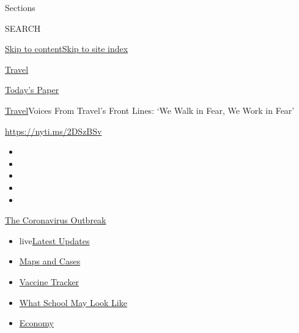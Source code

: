Sections

SEARCH

\protect\hyperlink{site-content}{Skip to
content}\protect\hyperlink{site-index}{Skip to site index}

\href{https://www.nytimes.com/section/travel}{Travel}

\href{https://myaccount.nytimes.com/auth/login?response_type=cookie\&client_id=vi}{}

\href{https://www.nytimes.com/section/todayspaper}{Today's Paper}

\href{/section/travel}{Travel}\textbar{}Voices From Travel's Front
Lines: `We Walk in Fear, We Work in Fear'

\url{https://nyti.ms/2DSzBSv}

\begin{itemize}
\item
\item
\item
\item
\item
\end{itemize}

\href{https://www.nytimes.com/news-event/coronavirus?action=click\&pgtype=Article\&state=default\&region=TOP_BANNER\&context=storylines_menu}{The
Coronavirus Outbreak}

\begin{itemize}
\tightlist
\item
  live\href{https://www.nytimes.com/2020/08/01/world/coronavirus-covid-19.html?action=click\&pgtype=Article\&state=default\&region=TOP_BANNER\&context=storylines_menu}{Latest
  Updates}
\item
  \href{https://www.nytimes.com/interactive/2020/us/coronavirus-us-cases.html?action=click\&pgtype=Article\&state=default\&region=TOP_BANNER\&context=storylines_menu}{Maps
  and Cases}
\item
  \href{https://www.nytimes.com/interactive/2020/science/coronavirus-vaccine-tracker.html?action=click\&pgtype=Article\&state=default\&region=TOP_BANNER\&context=storylines_menu}{Vaccine
  Tracker}
\item
  \href{https://www.nytimes.com/interactive/2020/07/29/us/schools-reopening-coronavirus.html?action=click\&pgtype=Article\&state=default\&region=TOP_BANNER\&context=storylines_menu}{What
  School May Look Like}
\item
  \href{https://www.nytimes.com/live/2020/07/31/business/stock-market-today-coronavirus?action=click\&pgtype=Article\&state=default\&region=TOP_BANNER\&context=storylines_menu}{Economy}
\end{itemize}

